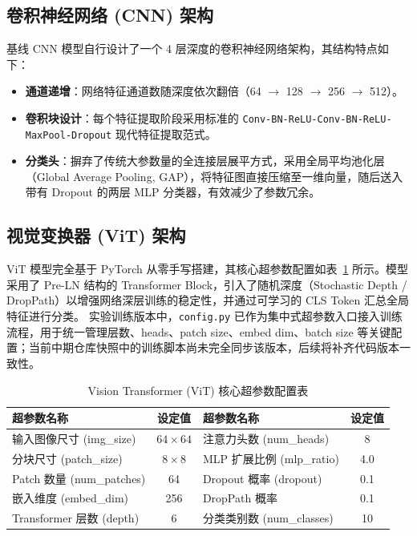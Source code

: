 \documentclass[a4paper, 12pt]{article}
\begin{document}
\subsection{卷积神经网络 (CNN) 架构}
基线 CNN 模型自行设计了一个 4 层深度的卷积神经网络架构，其结构特点如下：
\begin{itemize}
    \item \textbf{通道递增}：网络特征通道数随深度依次翻倍（64 $\rightarrow$ 128 $\rightarrow$ 256 $\rightarrow$ 512）。
    \item \textbf{卷积块设计}：每个特征提取阶段采用标准的 \texttt{Conv-BN-ReLU-Conv-BN-ReLU-MaxPool-Dropout} 现代特征提取范式。
    \item \textbf{分类头}：摒弃了传统大参数量的全连接层展平方式，采用全局平均池化层（Global Average Pooling, GAP），将特征图直接压缩至一维向量，随后送入带有 Dropout 的两层 MLP 分类器，有效减少了参数冗余。
\end{itemize}

\subsection{视觉变换器 (ViT) 架构}
ViT 模型完全基于 PyTorch 从零手写搭建，其核心超参数配置如表~\ref{tab:vit_hyperparams} 所示。模型采用了 Pre-LN 结构的 Transformer Block，引入了随机深度（Stochastic Depth / DropPath）以增强网络深层训练的稳定性，并通过可学习的 CLS Token 汇总全局特征进行分类。
实验训练版本中，\texttt{config.py} 已作为集中式超参数入口接入训练流程，用于统一管理层数、heads、patch size、embed dim、batch size 等关键配置；当前中期仓库快照中的训练脚本尚未完全同步该版本，后续将补齐代码版本一致性。

\begin{table}[H]
    \centering
    \caption{Vision Transformer (ViT) 核心超参数配置表}
    \label{tab:vit_hyperparams}
    \renewcommand{\arraystretch}{1.2}
    \begin{tabular}{lc|lc}
        \toprule
        \textbf{超参数名称} & \textbf{设定值} & \textbf{超参数名称} & \textbf{设定值} \\
        \midrule
        输入图像尺寸 (img\_size) & $64 \times 64$ & 注意力头数 (num\_heads) & 8 \\
        分块尺寸 (patch\_size) & $8 \times 8$   & MLP 扩展比例 (mlp\_ratio) & 4.0 \\
        Patch 数量 (num\_patches)& 64             & Dropout 概率 (dropout) & 0.1 \\
        嵌入维度 (embed\_dim)    & 256            & DropPath 概率 & 0.1 \\
        Transformer 层数 (depth)& 6              & 分类类别数 (num\_classes) & 10 \\
        \bottomrule
    \end{tabular}
\end{table}
\end{document}
